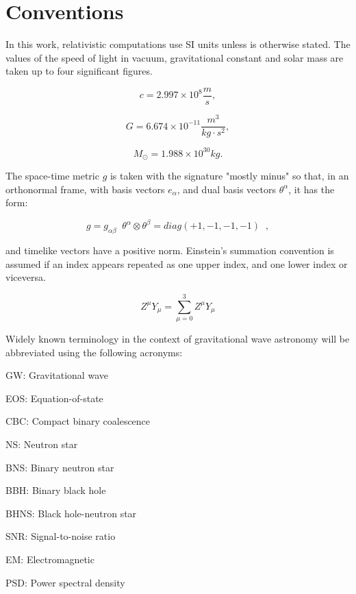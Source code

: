 \newpage
\chapter*{Conventions}
In this work, relativistic computations use SI units unless is otherwise stated. The values of the speed of light in vacuum\cite{si-brochure}, gravitational constant\cite{Anderson_2015} and solar mass are taken up to four significant figures.

$$ c = 2.997\times 10^8 \frac{m}{s}, $$

$$ G = 6.674\times 10^{-11}\frac{m^3}{kg\cdot s^2},$$

$$ M_{\odot} = 1.988 \times 10^{30} kg.$$

The space-time metric $g$ is taken with the signature "mostly minus" so that, in an orthonormal frame, with basis vectors $e_{\alpha}$, and dual basis vectors $\theta^{\alpha}$, it has the form:

$$ g = g_{\alpha \beta} \;\; \theta^{\alpha} \otimes \theta^{\beta} = diag(+1,-1,-1,-1)\;\; ,$$

and timelike vectors have a positive norm. Einstein's summation convention is assumed if an index appears repeated as one upper index, and one lower index or viceversa.

$$ Z^\mu Y_\mu = \sum_{\mu=0}^3 Z^\mu Y_\mu $$

Widely known terminology in the context of gravitational wave astronomy will be abbreviated using the following acronyms:

\vspace{1cm}

GW: Gravitational wave

EOS: Equation-of-state

CBC: Compact binary coalescence

NS: Neutron star

BNS: Binary neutron star

BBH: Binary black hole

BHNS: Black hole-neutron star 

SNR: Signal-to-noise ratio

EM: Electromagnetic

PSD: Power spectral density




